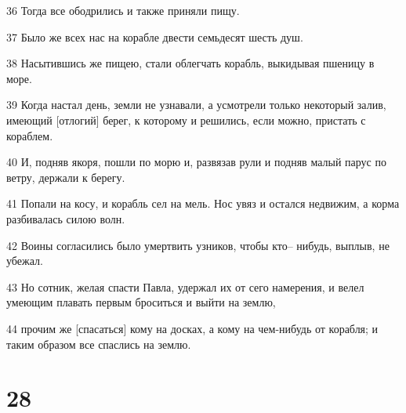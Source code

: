 \par 36 Тогда все ободрились и также приняли пищу.
\par 37 Было же всех нас на корабле двести семьдесят шесть душ.
\par 38 Насытившись же пищею, стали облегчать корабль, выкидывая пшеницу в море.
\par 39 Когда настал день, земли не узнавали, а усмотрели только некоторый залив, имеющий [отлогий] берег, к которому и решились, если можно, пристать с кораблем.
\par 40 И, подняв якоря, пошли по морю и, развязав рули и подняв малый парус по ветру, держали к берегу.
\par 41 Попали на косу, и корабль сел на мель. Нос увяз и остался недвижим, а корма разбивалась силою волн.
\par 42 Воины согласились было умертвить узников, чтобы кто-- нибудь, выплыв, не убежал.
\par 43 Но сотник, желая спасти Павла, удержал их от сего намерения, и велел умеющим плавать первым броситься и выйти на землю,
\par 44 прочим же [спасаться] кому на досках, а кому на чем-нибудь от корабля; и таким образом все спаслись на землю.

\chapter{28}

